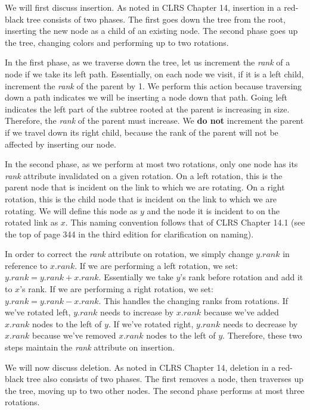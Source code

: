 \documentclass[11pt]{article}
\begin{document}
We will first discuss insertion. As noted in CLRS Chapter 14, insertion in a red-black tree consists of two phases. The first goes down the tree from the root, inserting the new node as a child of an existing node. The second phase goes up the tree, changing colors and performing up to two rotations.

In the first phase, as we traverse down the tree, let us increment the \textit{rank} of a node if we take its left path. Essentially, on each node we visit, if it is a left child, increment the \textit{rank} of the parent by 1. We perform this action because traversing down a path indicates we will be inserting a node down that path. Going left indicates the left part of the subtree rooted at the parent is increasing in size. Therefore, the \textit{rank} of the parent must increase. We \textbf{do not} increment the parent if we travel down its right child, because the rank of the parent will not be affected by inserting our node.

In the second phase, as we perform at most two rotations, only one node has its \textit{rank} attribute invalidated on a given rotation. On a left rotation, this is the parent node that is incident on the link to which we are rotating. On a right rotation, this is the child node that is incident on the link to which we are rotating. We will define this node as $y$ and the node it is incident to on the rotated link as $x$. This naming convention follows that of CLRS Chapter 14.1 (see the top of page 344 in the third edition for clarification on naming).

In order to correct the \textit{rank} attribute on rotation, we simply change $y.rank$ in reference to $x.rank$. If we are performing a left rotation, we set: $y.rank = y.rank + x.rank$. Essentially we take $y$'s rank before rotation and add it to $x$'s rank. If we are performing a right rotation, we set: $y.rank = y.rank - x.rank$. This handles the changing ranks from rotations. If we've rotated left, $y.rank$ needs to increase by $x.rank$ because we've added $x.rank$ nodes to the left of $y$. If we've rotated right, $y.rank$ needs to decrease by $x.rank$ because we've removed $x.rank$ nodes to the left of $y$. Therefore, these two steps maintain the \textit{rank} attribute on insertion.

We will now discuss deletion. As noted in CLRS Chapter 14, deletion in a red-black tree also consists of two phases. The first removes a node, then traverses up the tree, moving up to two other nodes. The second phase performs at most three rotations.
\end{document}

